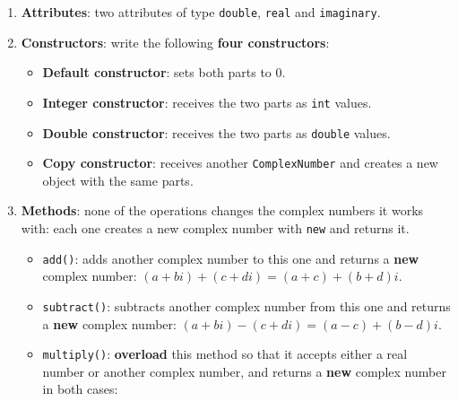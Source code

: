 \begin{enumerate}

    \item \textbf{Attributes}: two attributes of type \texttt{double}, \texttt{real} and \texttt{imaginary}.

    \item \textbf{Constructors}: write the following \textbf{four constructors}:

        \begin{itemize}

            \item \textbf{Default constructor}: sets both parts to \(0\).

            \item \textbf{Integer constructor}: receives the two parts as \texttt{int} values.

            \item \textbf{Double constructor}: receives the two parts as \texttt{double} values.

            \item \textbf{Copy constructor}: receives another \texttt{ComplexNumber} and creates a new object with the same parts.

        \end{itemize}

    \item \textbf{Methods}: none of the operations changes the complex numbers it works with: each one creates a new complex number with \texttt{new} and returns it.

        \begin{itemize}

            \item \texttt{add()}: adds another complex number to this one and returns a \textbf{new} complex number: \((a + bi) + (c + di) = (a + c) + (b + d)i\).

            \item \texttt{subtract()}: subtracts another complex number from this one and returns a \textbf{new} complex number: \((a + bi) - (c + di) = (a - c) + (b - d)i\).

            \item \texttt{multiply()}: \textbf{overload} this method so that it accepts either a real number or another complex number, and returns a \textbf{new} complex number in both cases:

                \begin{itemize}


\end{itemize}
\end{itemize}
\end{enumerate}
